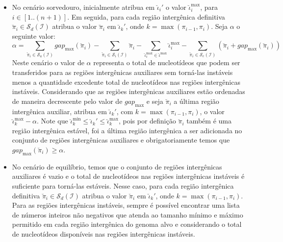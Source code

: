\begin{itemize}
\begin{itemize}
    \item No cenário sorvedouro, inicialmente atribua em $\breve\iota_{i}'$ o valor $\breve\iota^{\max}_i$, para $i \in [1..({n+1})]$. Em seguida, para cada região intergênica definitiva $\breve\pi_i \in \mathcal{S}_{d}(\mathcal{I})$ atribua o valor $\breve\pi_i$ em $\breve\iota_{k}'$, onde $k = \max(\pi_{i-1},\pi_i)$. Seja $\alpha$ o seguinte valor:
  $$\alpha = \sum_{\breve\pi_i \in \mathcal{S}_{a}(\mathcal{I})} gap_{\max}(\breve\pi_i) - \sum_{\breve\pi_i \in \mathcal{S}_{i}(\mathcal{I})} \breve\pi_i - \sum_{\breve\iota_{i}^{\max}  \in \breve\iota^{\max}} \breve\iota_{i}^{\max} - \sum_{\breve\pi_i \in \mathcal{S}_{e}(\mathcal{I})} (\breve\pi_i + gap_{\max}(\breve\pi_i))$$
    Neste cenário o valor de $\alpha$ representa o total de nucleotídeos que podem ser transferidos para as regiões intergênicas auxiliares sem torná-las instáveis menos a quantidade excedente total de nucleotídeos nas regiões intergênicas instáveis. Considerando que as regiões intergênicas auxiliares estão ordenadas de maneira decrescente pelo valor de $gap_{\max}$ e seja $\breve\pi_i$ a última região intergênica auxiliar, atribua em $\breve\iota_{k}'$, com $k = \max(\pi_{i-1},\pi_i)$, o valor $\breve\iota^{\max}_k - \alpha$. Note que $\breve\iota^{\min}_k \le \breve\iota_{k}' \le \breve\iota^{\max}_k$, pois por definição $\breve\pi_i$ também é uma região intergênica estável, foi a última região intergênica a ser adicionada no conjunto de regiões intergênicas auxiliares e obrigatoriamente temos que $gap_{\max}(\breve\pi_i) \ge \alpha$.

    \item No cenário de equilíbrio, temos que o conjunto de regiões intergênicas auxiliares é vazio e o total de nucleotídeos nas regiões intergênicas instáveis é suficiente para torná-las estáveis. Nesse caso, para cada região intergênica definitiva $\breve\pi_i \in \mathcal{S}_{d}(\mathcal{I})$ atribua o valor $\breve\pi_i$ em $\breve\iota_{k}'$, onde $k = \max(\pi_{i-1},\pi_i)$. Para as regiões intergênicas instáveis, sempre é possível encontrar uma lista de números inteiros não negativos que atenda ao tamanho mínimo e máximo permitido em cada região intergênica do genoma alvo e considerando o total de nucleotídeos disponíveis nas regiões intergênicas instáveis.
  \end{itemize}
\end{itemize}

